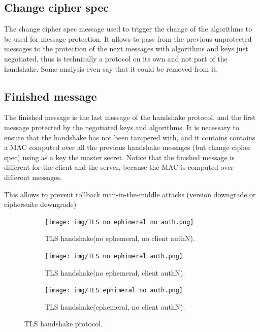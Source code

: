 \subsection{Change cipher spec}
The change cipher spec message used to trigger the change of the
algorithms to be used for message protection. It allows to pass from
the previous unprotected messages to the protection of the next
messages with algorithms and keys just negotiated, thus is technically
a protocol on its own and not part of the handshake. Some analysis
even say that it could be removed from it.


\subsection{Finished message}
The finished message is the last message of the handshake protocol,
and the first message protected by the negotiated keys and algorithms.
It is necessary to ensure that the handshake has not been tampered
with, and it contains contains a MAC computed over all the previous
handshake messages (but change cipher spec) using as a key the master
secret. Notice that the finished message is different for the client 
and the server, because the MAC is computed over different messages.

This allows to prevent rollback man-in-the-middle attacks (version
downgrade or ciphersuite downgrade)

\begin{figure}[H]
  \centering
  \begin{subfigure}{.5\textwidth}
    \centering
    \texttt{[image: img/TLS no ephimeral no
    auth.png]}
    \caption{TLS handshake(no ephemeral, no client authN).}
    \label{fig:tls-handshake-protocol}
  \end{subfigure}%
  \begin{subfigure}{.5\textwidth}
    \centering
    \texttt{[image: img/TLS no ephimeral
    auth.png]}
    \caption{TLS handshake(no ephemeral, client authN).}
    \label{fig:tls-handshake-protocol-2}
  \end{subfigure}
  \begin{subfigure}{.5\textwidth}
    \centering
    \texttt{[image: img/TLS ephimeral no
    auth.png]}
    \caption{TLS handshake(ephemeral, no client authN).}
    \label{fig:tls-handshake-protocol-3}
  \end{subfigure}
  \caption{TLS handshake protocol.}
\end{figure}

